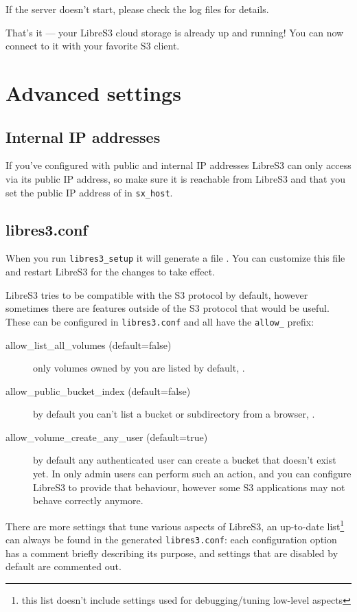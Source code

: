 If the server doesn't start, please check the log files for details.

That's it --- your LibreS3 cloud storage is already up and running!
You can now connect to it with your favorite S3 client.

\section{Advanced settings}

\subsection{Internal IP addresses}

If you've configured \SX with public and internal IP addresses LibreS3 can only
access \SX via its public IP address, so make sure it is reachable from LibreS3
and that you set the public IP address of \SX in \verb|sx_host|.

\subsection{libres3.conf}

When you run \verb|libres3_setup| it will generate a file
.
You can customize this file and restart LibreS3 for the changes to take effect.

LibreS3 tries to be compatible with the S3 protocol by default, however
sometimes there are features outside of the S3 protocol that would be useful.
These can be configured in \verb|libres3.conf| and all have the \verb|allow_| prefix:
\begin{description}
\item[allow\_list\_all\_volumes (default=false)] only volumes owned by you are
  listed by default, .
\item[allow\_public\_bucket\_index (default=false)] by default you can't list a
  bucket or subdirectory from a browser, .
\item [allow\_volume\_create\_any\_user (default=true)] by default any authenticated
  user can create a bucket that doesn't exist yet. In \SX only admin users can
  perform such an action, and you can configure LibreS3 to provide that
  behaviour, however some S3 applications may not behave correctly anymore.
\end{description}

There are more settings that tune various aspects of LibreS3, an up-to-date
list\footnote{this list doesn't include settings used for debugging/tuning
  low-level aspects} can always be found in the generated \verb|libres3.conf|: each configuration option has
a comment briefly describing its purpose, and settings that are disabled by
default are commented out.


